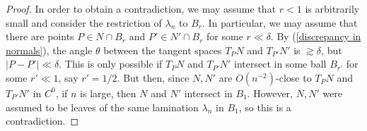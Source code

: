 \documentclass[reqno,11pt]{amsart}
\theoremstyle{definition}
\numberwithin{equation}{section}
\begin{document}
\begin{proof}
	In order to obtain a contradiction, we may assume that $r < 1$ is arbitrarily small and consider the restriction of $\lambda_n$ to $B_r$.
	In particular, we may assume that there are points $P \in N \cap B_r$ and $P' \in N' \cap B_r$ for some $r \ll \delta$.
	By (\ref{discrepancy in normals}), the angle $\theta$ between the tangent spaces $T_P N$ and $T_{P'} N'$ is $\gtrsim \delta$, but $|P - P'| \ll \delta$.
	This is only possible if $T_P N$ and $T_{P'} N'$ intersect in some ball $B_{r'}$ for some $r' \ll 1$, say $r' = 1/2$.
	But then, since $N, N'$ are $O(n^{-2})$-close to $T_P N$ and $T_{P'} N'$ in $C^0$, if $n$ is large, then $N$ and $N'$ intersect in $B_1$.
	However, $N, N'$ were assumed to be leaves of the same lamination $\lambda_n$ in $B_1$, so this is a contradiction.
\end{proof}
\end{document}
